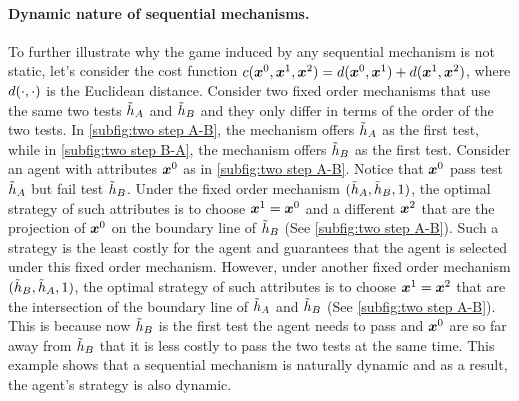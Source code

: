 \paragraph{Dynamic nature of sequential mechanisms.}
To further illustrate why the game induced by any sequential mechanism is not static, let's consider the cost function $c(\boldsymbol{x}^0,\boldsymbol{x}^1,\boldsymbol{x}^2)=d(\boldsymbol{x}^0,\boldsymbol{x}^1)+d(\boldsymbol{x}^1,\boldsymbol{x}^2)$, where $d(\cdot,\cdot)$ is the Euclidean distance.
Consider two fixed order mechanisms that use the same two tests $\tilde{h}_A$ and $\tilde{h}_B$ and they only differ in terms of the order of the two tests.
In \cref{subfig:two step A-B}, the mechanism offers $\tilde{h}_A$ as the first test, while in \cref{subfig:two step B-A}, the mechanism offers $\tilde{h}_B$ as the first test.
Consider an agent with attributes $\boldsymbol{x}^0$ as in \cref{subfig:two step A-B}.
Notice that $\boldsymbol{x}^0$ pass test $\tilde{h}_A$ but fail test $\tilde{h}_B$.
Under the fixed order mechanism $(\tilde{h}_A,\tilde{h}_B,1)$, the optimal strategy of such attributes is to choose $\boldsymbol{x}^1=\boldsymbol{x}^0$ and a different $\boldsymbol{x}^2$ that are the projection of $\boldsymbol{x}^0$ on the boundary line of $\tilde{h}_B$ (See \cref{subfig:two step A-B}).
Such a strategy is the least costly for the agent and guarantees that the agent is selected under this fixed order mechanism.
However, under another fixed order mechanism $(\tilde{h}_B,\tilde{h}_A,1)$, the optimal strategy of such attributes is to choose $\boldsymbol{x}^1=\boldsymbol{x}^2$ that are the intersection of  the boundary line of $\tilde{h}_A$ and $\tilde{h}_B$ (See \cref{subfig:two step A-B}).
This is because now $\tilde{h}_B$ is the first test the agent needs to pass and $\boldsymbol{x}^0$  are so far away from  $\tilde{h}_B$ that it is less costly to pass the two tests at the same time.
This example shows that a sequential mechanism is naturally dynamic and as a result, the agent's strategy is also dynamic. 




